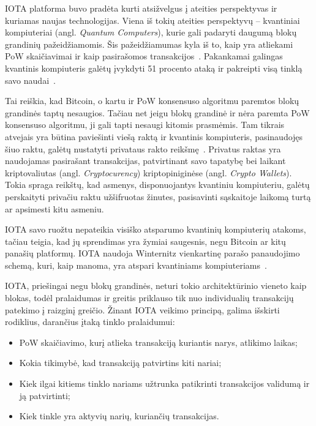IOTA platforma buvo pradėta kurti atsižvelgus į ateities perspektyvas ir kuriamas naujas technologijas. Viena iš tokių ateities perspektyvų – kvantiniai kompiuteriai (angl. \textit{Quantum Computers}), kurie gali padaryti daugumą blokų grandinių pažeidžiamomis. Šis pažeidžiamumas kyla iš to, kaip yra atliekami PoW skaičiavimai ir kaip pasirašomos transakcijos~\cite{kiktenko2018quantum}. Pakankamai galingas kvantinis kompiuteris galėtų įvykdyti 51 procento ataką ir pakreipti visą tinklą savo naudai~\cite{kiktenko2018quantum}. 

Tai reiškia, kad Bitcoin, o kartu ir PoW konsensuso algoritmu paremtos blokų grandinės taptų nesaugios. Tačiau net jeigu blokų grandinė ir nėra paremta PoW konsensuso algoritmu, ji gali tapti nesaugi kitomis prasmėmis. Tam tikrais atvejais yra būtina paviešinti viešą raktą ir kvantinis kompiuteris, pasinaudojęs šiuo raktu, galėtų nustatyti privataus rakto reikšmę~\cite{aggarwal2017quantum}. Privatus raktas yra naudojamas pasirašant transakcijas, patvirtinant savo tapatybę bei laikant kriptovaliutas (angl. \textit{Cryptocurency}) kriptopiniginėse (angl. \textit{Crypto Wallets}). Tokia spraga reikštų, kad asmenys, disponuojantys kvantiniu kompiuteriu, galėtų perskaityti privačiu raktu užšifruotas žinutes, pasisavinti sąskaitoje laikomą turtą ar apsimesti kitu asmeniu.

IOTA savo ruožtu nepateikia visiško atsparumo kvantinių kompiuterių atakoms, tačiau teigia, kad jų sprendimas yra žymiai saugesnis, negu Bitcoin ar kitų panašių platformų. IOTA naudoja Winternitz vienkartinę parašo panaudojimo schemą, kuri, kaip manoma, yra atspari kvantiniams kompiuteriams~\cite{el2018review}.




 \label{subsection:dag-throughput}

IOTA, priešingai negu blokų grandinės, neturi tokio architektūrinio vieneto kaip blokas, todėl pralaidumas ir greitis priklauso tik nuo individualių transakcijų patekimo į raizginį greičio. Žinant IOTA veikimo principą, galima išskirti rodiklius, darančius įtaką tinklo pralaidumui:
\begin{itemize}
    \item PoW skaičiavimo, kurį atlieka transakciją kuriantis narys, atlikimo laikas;
    \item Kokia tikimybė, kad transakciją patvirtins kiti nariai;
    \item Kiek ilgai kitiems tinklo nariams užtrunka patikrinti transakcijos validumą ir ją patvirtinti;
    \item Kiek tinkle yra aktyvių narių, kuriančių transakcijas.
\end{itemize}

